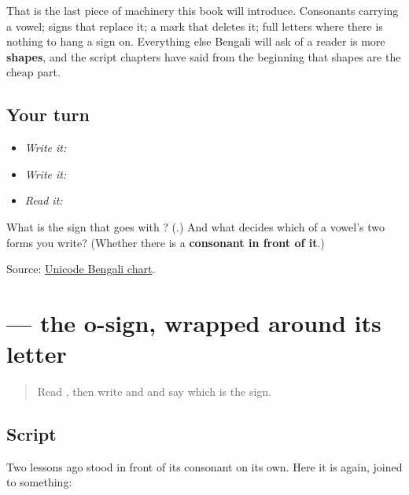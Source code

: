 That is the last piece of machinery this book will introduce. Consonants carrying a vowel; signs that replace it; a mark that deletes it; full letters where there is nothing to hang a sign on. Everything else Bengali will ask of a reader is more \textbf{shapes}, and the script chapters have said from the beginning that shapes are the cheap part.

\subsection*{Your turn}
\begin{itemize}
\raggedright
  \item \emph{Write it:} 
  \item \emph{Write it:}   
  \item \emph{Read it:}  
\end{itemize}

\begin{tcolorbox}[breakable,colback=teal!4,colframe=teal!35!black,title={Before you move on}]
What is the sign that goes with \textbf{}? (\textbf{}.) And what decides which of a vowel's two forms you write? (Whether there is a \textbf{consonant in front of it}.)

Source: \href{https://www.unicode.org/charts/PDF/U0980.pdf}{Unicode Bengali chart}.
\end{tcolorbox}
\section[\texorpdfstring{\bn{ো} (-o)}{ো (-o)}]{ — the o-sign, wrapped around its letter}

\label{lesson:BN-W03-o-matra}



\begin{quote}
Read \textbf{}, then write \textbf{} and \textbf{} and say which is the sign.
\end{quote}

\subsection*{Script}
Two lessons ago \textbf{} stood in front of its consonant on its own. Here it is again, joined to something:

\begin{quote}
\end{quote}

